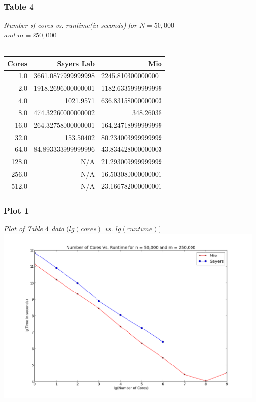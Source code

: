 \documentclass[letterpaper, 12pt]{article}
\begin{document}
	\subsubsection*{Table 4} \small\textit{Number of cores vs. runtime(in seconds) for $N=50,000$\\ and $m=250,000$} \\\\
	\normalsize
	\begin{tabular}{r||r|r}
	\hline
		Cores              &Sayers Lab                     &Mio \\ 
	\hline
		  1.0      &3661.0877999999998      &2245.8103000000001 \\ 
		  2.0      &1918.2696000000001      &1182.6335999999999 \\ 
		  4.0               &1021.9571      &636.83158000000003 \\ 
		  8.0      &474.32260000000002               &348.26038 \\ 
		 16.0      &264.32758000000001      &164.24718999999999 \\ 
		 32.0               &153.50402      &80.234003999999999 \\ 
		 64.0      &84.893333999999996      &43.834428000000003 \\ 
		128.0                     &N/A      &21.293009999999999 \\ 
		256.0                     &N/A      &16.503080000000001 \\ 
		512.0                     &N/A      &23.166782000000001 \\ 
		\hline
	\end{tabular}
	
	\subsubsection*{Plot 1} \small\textit{Plot of Table $4$ data $(lg(cores)$ vs. $lg(runtime))$} \\
	\normalsize
	\includegraphics[width=.75\linewidth]{ProjectFiles/results/plots/coresVtime.png}
	
\end{document}
